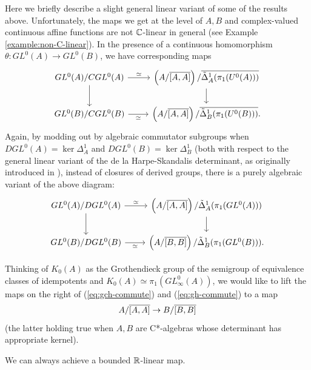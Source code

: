 \documentclass[12pt]{amsart}
\begin{document}
Here we briefly describe a slight general linear variant of some of the results above.
Unfortunately, the maps we get at the level of $A,B$ and complex-valued continuous affine functions are not $\mathbb{C}$-linear in general (see Example \ref{example:non-C-linear}). 
In the presence of a continuous homomorphism $\theta: GL^0(A) \to GL^0(B)$, we have corresponding maps
\begin{equation}\label{eq:gch-commute}
\begin{tikzcd}
GL^0(A)/CGL^0(A) \arrow[r, "\simeq"] \arrow[d] & \left(A/\ov{[A,A]}\right)/\ov{\tD_A^1(\pi_1(U^0(A)))} \arrow[d] \\
GL^0(B)/CGL^0(B) \arrow[r, "\simeq"']          & \left(A/\ov{[A,A]}\right)/\ov{\tD_B^1(\pi_1(U^0(B)))}     .    
\end{tikzcd}
\end{equation}
Again, by modding out by algebraic commutator subgroups when $DGL^0(A) = \ker \Delta_A^1$ and $DGL^0(B) = \ker \Delta_B^1$ (both with respect to the general linear variant of the de la Harpe-Skandalis determinant, as originally introduced in \cite{dlHS84a}), instead of closures of derived groups, there is a purely algebraic variant of the above diagram:
\begin{equation}\label{eq:gh-commute}
\begin{tikzcd}
GL^0(A)/DGL^0(A) \arrow[r, "\simeq"] \arrow[d] &\left(A/\ov{[A,A]}\right)/\tD_A^1(\pi_1(GL^0(A))) \arrow[d] \\
GL^0(B)/DGL^0(B) \arrow[r, "\simeq"']          & \left(A/\ov{[B,B]}\right)/\tD_B^1(\pi_1(GL^0(B))).
\end{tikzcd}
\end{equation}

Thinking of $K_0(A)$ as the Grothendieck group of the semigroup of equivalence classes of idempotents and $K_0(A) \simeq \pi_1(GL_{\infty}^0(A))$, we would like to lift the maps on the right of (\ref{eq:gch-commute}) and (\ref{eq:gh-commute})
to a map
\begin{equation}
A/\overline{[A,A]} \to B/\overline{[B,B]}
\end{equation}
(the latter holding true when $A,B$ are C*-algebras whose determinant has appropriate kernel).

We can always achieve a bounded $\mathbb{R}$-linear map. 
\end{document}
